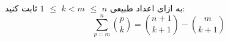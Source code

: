 \p
به ازای اعداد طبیعی
$n$ $\leq$ $k < m$ $\leq$ $1$
ثابت کنید:
\[
    \sum\limits_{p=m}^{n}\binom{p}{k} = \binom{n + 1}{k + 1} - \binom{m}{k + 1}
\]
